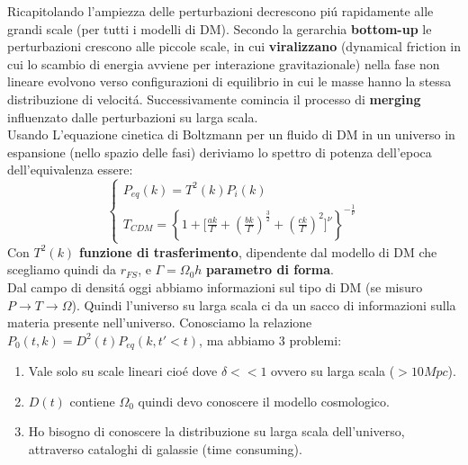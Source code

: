 \documentclass[12pt, a4paper]{article}
\begin{document}
Ricapitolando l'ampiezza delle perturbazioni decrescono pi\'{u} rapidamente alle grandi scale (per tutti i modelli di DM). Secondo la gerarchia \textbf{bottom-up} le perturbazioni crescono alle piccole scale, in cui \textbf{viralizzano} (dynamical friction in cui lo scambio di energia avviene per interazione gravitazionale) nella fase non lineare evolvono verso configurazioni di equilibrio in cui le masse hanno la stessa distribuzione di velocit\'{a}. Successivamente comincia il processo di \textbf{merging} influenzato dalle perturbazioni su larga scala.\\
Usando L'equazione cinetica di Boltzmann per un fluido di DM in un universo in espansione (nello spazio delle fasi) deriviamo lo spettro di potenza dell'epoca dell'equivalenza essere:
\begin{equation}
\begin{cases}
P_{eq}(k)=T^2(k)P_i(k)
\\
T_{CDM}=\left\{   1+\big[ \frac{ak}{\Gamma}+(\frac{bk}{\Gamma})^{\frac{3}{2}}+(\frac{ck}{\Gamma})^2\big]^{\nu}  \right\}^{-\frac{1}{\nu}}
\end{cases}
\end{equation}
Con $T^2(k)$ \textbf{funzione di trasferimento}, dipendente dal modello di DM che scegliamo quindi da $r_{FS}$, e $\Gamma=\Omega_0 h$ \textbf{parametro di forma}. \\
Dal campo di densit\'{a} oggi abbiamo informazioni sul tipo di DM (se misuro $P\rightarrow T\rightarrow \Omega$). Quindi l'universo su larga scala ci da un sacco di informazioni sulla  materia presente nell'universo. Conosciamo la relazione $P_0(t,k)=D^2(t)P_{eq}(k,t'<t)$, ma abbiamo 3 problemi:
\begin{enumerate}
\item Vale solo su scale lineari cio\'{e} dove $\delta<<1$ ovvero su larga scala ($>10Mpc$).
\item $D(t)$ contiene $\Omega_0$ quindi devo conoscere il modello cosmologico.
\item Ho bisogno di conoscere la distribuzione su larga scala dell'universo, attraverso cataloghi di galassie (time consuming).
\end{enumerate}
\end{document}
